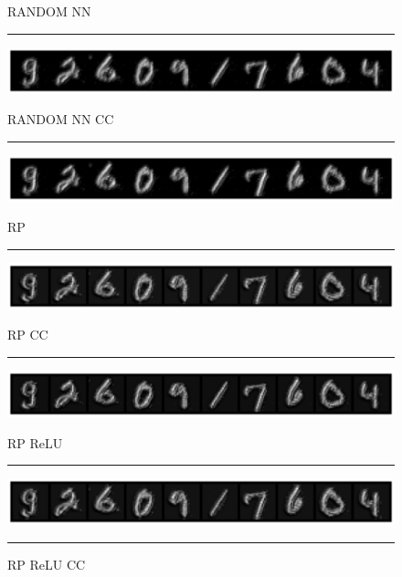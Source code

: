\begin{figure}[h]
    \centering
    \setlength{\abovecaptionskip}{0pt plus 0pt minus 0pt}
    \setlength{\belowcaptionskip}{10pt plus 0pt minus 0pt}
    \caption*{\normalsize{RANDOM NN}}
    \rule{0.4\textwidth}{.4pt}
    
    \centerline{\hspace*{8mm}\includegraphics[width=1.4\textwidth]{figures/reconstruction_MNIST_RANDOM_NN_epoch_100.png}}
    \caption*{\normalsize{RANDOM NN CC}}
    \rule{0.4\textwidth}{.4pt}
    
    \centerline{\hspace*{8mm}\includegraphics[width=1.4\textwidth]{figures/reconstruction_MNIST_RANDOM_NN_CC_epoch_100.png}}
    \caption*{\normalsize{RP}}
    \rule{0.4\textwidth}{.4pt}
    
    \centerline{\hspace*{8mm}\includegraphics[width=1.4\textwidth]{figures/reconstruction_MNIST_RP_epoch_100.png}}
    \caption*{\normalsize{RP CC}}
    \rule{0.4\textwidth}{.4pt}
    
    \centerline{\hspace*{8mm}\includegraphics[width=1.4\textwidth]{figures/reconstruction_MNIST_RP_CC_epoch_100.png}}
    \caption*{\normalsize{RP ReLU}}
    \rule{0.4\textwidth}{.4pt}
    
    \centerline{\hspace*{8mm}\includegraphics[width=1.4\textwidth]{figures/reconstruction_MNIST_RP_ReLU_epoch_100.png}}
    \caption*{\normalsize{RP ReLU CC}}
    \rule{0.4\textwidth}{.4pt}
    

\end{figure}
